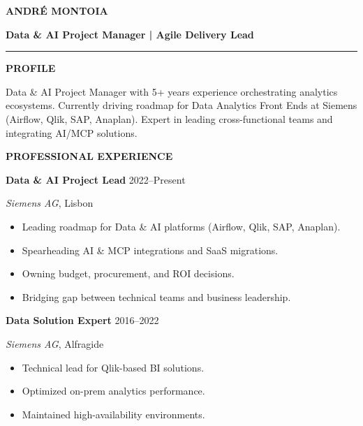 \documentclass[a4paper,10pt]{article}
\begin{document}
\begin{minipage}[t]{0.62\textwidth}
    \vspace{10pt}
    {\Huge \bfseries\color{maindark} ANDRÉ MONTOIA}\par
    \vspace{4pt}
    {\Large \bfseries\color{accent} Data \& AI Project Manager | Agile Delivery Lead}\par
    \vspace{8pt}
    \noindent\rule{\linewidth}{1pt}\par
    \vspace{12pt}

    {\bfseries\color{maindark} PROFILE}\par
    {\small\color{mainlight} Data \& AI Project Manager with 5+ years experience orchestrating analytics ecosystems. Currently driving roadmap for Data Analytics Front Ends at Siemens (Airflow, Qlik, SAP, Anaplan). Expert in leading cross-functional teams and integrating AI/MCP solutions.}\par
    \vspace{12pt}

    {\bfseries\color{maindark} PROFESSIONAL EXPERIENCE}\par

    \textbf{Data \& AI Project Lead} \hfill \color{accent}2022--Present\par
    \textit{\color{accent}Siemens AG}, Lisbon\par
    \begin{itemize}[leftmargin=*, label=\color{accent}•, itemsep=2pt, topsep=4pt]
        \item \small\color{mainlight}Leading roadmap for Data \& AI platforms (Airflow, Qlik, SAP, Anaplan).
        \item \small\color{mainlight}Spearheading AI \& MCP integrations and SaaS migrations.
        \item \small\color{mainlight}Owning budget, procurement, and ROI decisions.
        \item \small\color{mainlight}Bridging gap between technical teams and business leadership.
    \end{itemize}
    \vspace{6pt}

    \textbf{Data Solution Expert} \hfill \color{accent}2016--2022\par
    \textit{\color{accent}Siemens AG}, Alfragide\par
    \begin{itemize}[leftmargin=*, label=\color{accent}•, itemsep=2pt, topsep=4pt]
        \item \small\color{mainlight}Technical lead for Qlik-based BI solutions.
        \item \small\color{mainlight}Optimized on-prem analytics performance.
        \item \small\color{mainlight}Maintained high-availability environments.
    \end{itemize}
    \vspace{6pt}


\end{minipage}
\end{document}
